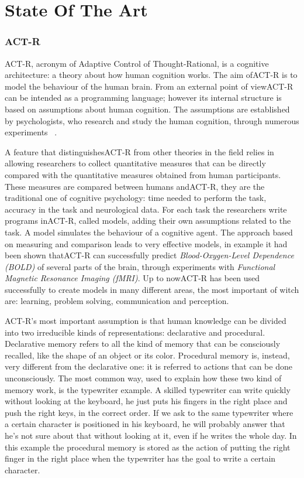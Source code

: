 \chapter{State Of The Art}
  \subsection{ACT-R}
	ACT-R, acronym of Adaptive Control of Thought-Rational, is a cognitive architecture: a theory about how human cognition works. 
	The aim of\mbox{ACT-R} is to model the behaviour of the human brain. From an external point of view\mbox{ACT-R} can be intended as a programming language; however its internal structure is based on assumptions about human cognition. The assumptions are established by psychologists, who research and study the human cognition, through numerous experiments ~\cite{Allen94}. 

	A feature that distinguishes\mbox{ACT-R} from other theories in the field relies in allowing researchers to collect quantitative measures that can be directly compared with the quantitative measures obtained from human participants. These measures are compared between humans and\mbox{ACT-R}, they are the traditional one of cognitive psychology: time needed to perform the task, accuracy in the task and neurological data. For each task the researchers write programs in\mbox{ACT-R}, called models, adding their own assumptions related to the task. A model simulates the behaviour of a cognitive agent. The approach based on measuring and comparison leads to very effective models, in example it had been shown that\mbox{ACT-R} can successfully predict \emph{Blood-Oxygen-Level Dependence (BOLD)} of several parts of the brain, through experiments with \emph{Functional Magnetic Resonance Imaging (fMRI)}.
	Up to now\mbox{ACT-R} has been used successfully to create models in many different areas, the most important of witch are: learning, problem solving, communication and perception.

	ACT-R's most important assumption is that human knowledge can be divided into two irreducible kinds of representations: declarative and procedural.
	Declarative memory refers to all the kind of memory that can be consciously recalled, like the shape of an object or its color. Procedural memory is, instead, very different from the declarative one: it is referred to actions that can be done unconsciously. The most common way, used to explain how these two kind of memory work, is the typewriter example.
	A skilled typewriter can write quickly without looking at the keyboard, he just puts his fingers in the right place and push the right keys, in the correct order. If we ask to the same typewriter where a certain character is positioned in his keyboard, he will probably answer that he's not sure about that without looking at it, even if he writes the whole day. In this example the procedural memory is stored as the action of putting the right finger in the right place when the typewriter has the goal to write a certain character.


